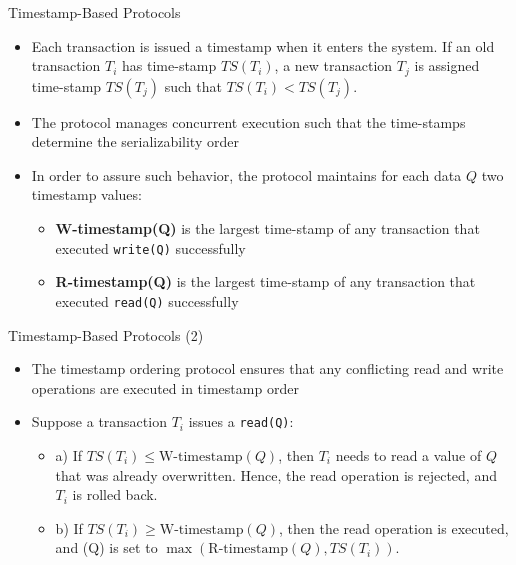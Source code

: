 \documentclass[aspectratio=169, xcolor=dvipsnames]{beamer}
\begin{document}
\begin{frame}{Timestamp-Based Protocols}
    \begin{itemize}[<+->]
        \item Each transaction is issued a timestamp when it enters the system. If an old transaction $T_i$ has time-stamp $TS(T_i)$, a new transaction $T_j$ is assigned time-stamp $TS(T_j)$ such that $TS(T_i) < TS(T_j)$.
        \item The protocol manages concurrent execution such that the time-stamps determine the serializability order
        \item In order to assure such behavior, the protocol maintains for each data $Q$ two timestamp values:
        \begin{itemize}
            \item[$\triangleright$] \textbf{W-timestamp(Q)} is the largest time-stamp of any transaction that executed \texttt{write(Q)} successfully
            \item[$\triangleright$] \textbf{R-timestamp(Q)} is the largest time-stamp of any transaction that executed \texttt{read(Q)} successfully
        \end{itemize}
    \end{itemize}
\end{frame}

\begin{frame}{Timestamp-Based Protocols (2)}
    \begin{itemize}[<+->]
        \item The timestamp ordering protocol ensures that any conflicting read and write operations are executed in timestamp order
        \item Suppose a transaction $T_i$ issues a \texttt{read(Q)}:
        \begin{itemize}
            \item[$\triangleright$] a) If $TS(T_i) \le \text{W-timestamp}(Q)$, then $T_i$ needs to read a value of $Q$ that was already overwritten. Hence, the read operation is rejected, and $T_i$ is rolled back.
            \item[$\triangleright$] b) If $TS(T_i) \ge \text{W-timestamp}(Q)$, then the read operation is executed, and (Q) is set to $\max(\text{R-timestamp}(Q), TS(T_i))$.
        \end{itemize}
    \end{itemize}
\end{frame}
\end{document}
